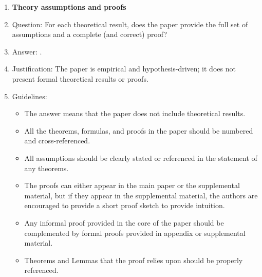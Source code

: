 \begin{enumerate}
\item {\bf Theory assumptions and proofs}
    \item[] Question: For each theoretical result, does the paper provide the full set of assumptions and a complete (and correct) proof?
    \item[] Answer: \answerNA{}.
    \item[] Justification: The paper is empirical and hypothesis-driven; it does not present formal theoretical results or proofs.
    \item[] Guidelines:
    \begin{itemize}
        \item The answer \answerNA{} means that the paper does not include theoretical results.
        \item All the theorems, formulas, and proofs in the paper should be numbered and cross-referenced.
        \item All assumptions should be clearly stated or referenced in the statement of any theorems.
        \item The proofs can either appear in the main paper or the supplemental material, but if they appear in the supplemental material, the authors are encouraged to provide a short proof sketch to provide intuition.
        \item Any informal proof provided in the core of the paper should be complemented by formal proofs provided in appendix or supplemental material.
        \item Theorems and Lemmas that the proof relies upon should be properly referenced.
    \end{itemize}


\end{enumerate}

